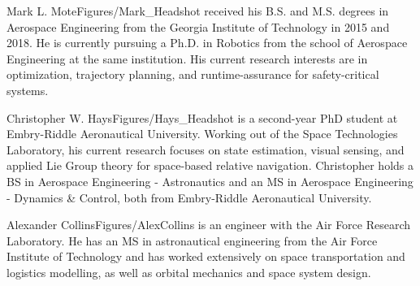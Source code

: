 \documentclass[twocolumn,letterpaper]{IEEEAerospaceCLS}  %
\theoremstyle{definition}
\begin{document}
%
%


%







\thebiography


\begin{biographywithpic}{Mark L. Mote}{Figures/Mark_Headshot}
 received his B.S. and M.S. degrees in Aerospace Engineering from the Georgia Institute of Technology in 2015 and 2018. He is currently pursuing a Ph.D. in Robotics from the school of Aerospace Engineering at the same institution. His current research interests are in optimization, trajectory planning, and runtime-assurance for safety-critical systems. 
\end{biographywithpic}

\begin{biographywithpic}{Christopher W. Hays}{Figures/Hays_Headshot}
is a second-year PhD student at Embry-Riddle Aeronautical University. Working out of the Space Technologies Laboratory, his current research focuses on state estimation, visual sensing, and applied Lie Group theory for space-based relative navigation. Christopher holds a BS in Aerospace Engineering - Astronautics and an MS in Aerospace Engineering - Dynamics \& Control, both from Embry-Riddle Aeronautical University.
\end{biographywithpic}

\begin{biographywithpic}{Alexander Collins}{Figures/AlexCollins}
 is an engineer with the Air Force Research Laboratory. He has an MS in astronautical engineering from the Air Force Institute of Technology and has worked extensively on space transportation and logistics modelling, as well as orbital mechanics and space system design.
\end{biographywithpic}
\vspace{13pt}
\end{document}
